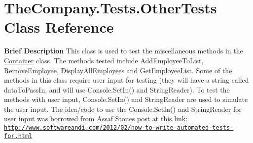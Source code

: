 \hypertarget{class_the_company_1_1_tests_1_1_other_tests}{}\section{The\+Company.\+Tests.\+Other\+Tests Class Reference}
\label{class_the_company_1_1_tests_1_1_other_tests}


{\bfseries  Brief Description} This class is used to test the miscellaneous methods in the \hyperlink{class_the_company_1_1_container}{Container} class. The methods tested include Add\+Employee\+To\+List, Remove\+Employee, Display\+All\+Employees and Get\+Employee\+List. Some of the methods in this class require user input for testing (they will have a string called data\+To\+Pass\+In, and will use Console.\+Set\+In() and String\+Reader). To test the methods with user input, Console.\+Set\+In() and String\+Reader are used to simulate the user input. The idea/code to use the Console.\+Set\+In() and String\+Reader for user input was borrowed from Assaf Stone\textquotesingle{}s post at this link\+: \href{http://www.softwareandi.com/2012/02/how-to-write-automated-tests-for.html}{\tt http\+://www.\+softwareandi.\+com/2012/02/how-\/to-\/write-\/automated-\/tests-\/for.\+html}  


